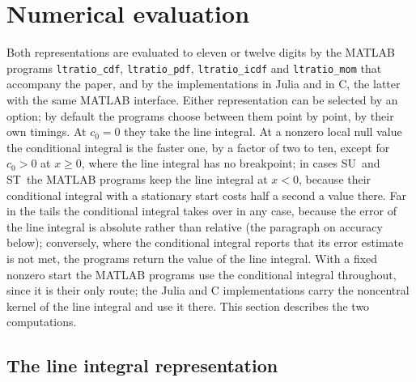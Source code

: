 \documentclass[ecta,nameyear,final,supplement]{econsocart}
\newcommand{\Su}{\textsf{\upshape SU}}
\newcommand{\St}{\textsf{\upshape ST}}
\theoremstyle{plain}
\theoremstyle{definition}
\begin{document}
\section{Numerical evaluation}
\label{sec:numerics}

Both representations are evaluated to eleven or twelve digits by the MATLAB programs \texttt{ltratio\_cdf}, \texttt{ltratio\_pdf}, \texttt{ltratio\_icdf} and \texttt{ltratio\_mom} that accompany the paper, and by the implementations in Julia and in C, the latter with the same MATLAB interface.  Either representation can be selected by an option; by default the programs choose between them point by point, by their own timings.  At $c_0=0$ they take the line integral.  At a nonzero local null value the conditional integral is the faster one, by a factor of two to ten, except for $c_0>0$ at $x\ge0$, where the line integral has no breakpoint; in cases \Su\ and \St\ the MATLAB programs keep the line integral at $x<0$, because their conditional integral with a stationary start costs half a second a value there.  Far in the tails the conditional integral takes over in any case, because the error of the line integral is absolute rather than relative (the paragraph on accuracy below); conversely, where the conditional integral reports that its error estimate is not met, the programs return the value of the line integral.  With a fixed nonzero start the MATLAB programs use the conditional integral throughout, since it is their only route; the Julia and C implementations carry the noncentral kernel of the line integral and use it there.  This section describes the two computations.

\subsection{The line integral representation}
\label{app:single}
\end{document}
